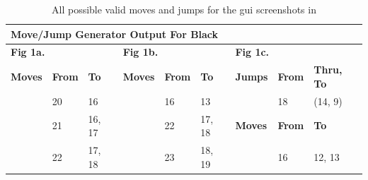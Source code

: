 \documentclass{article}
\begin{document}
\begin{table}[]
\centering
\caption{All possible valid moves and jumps for the gui screenshots in }
\label{table:moves-jumps}
\begin{tabular}{|lllllllll|}
\hline
\multicolumn{9}{|l|}{\textbf{Move/Jump Generator Output For Black}}                                                                                                                                                                                                                                                                                                  \\ \hline
\multicolumn{3}{|l|}{\textbf{Fig 1a.}}                                                                                 & \multicolumn{3}{l|}{\textbf{Fig 1b.}}                                                                                       & \multicolumn{3}{l|}{\textbf{Fig 1c.}}                                                                         \\ \hline
\multicolumn{1}{|l|}{\textbf{Moves}}           & \multicolumn{1}{l|}{\textbf{From}} & \multicolumn{1}{l|}{\textbf{To}} & \multicolumn{1}{l|}{\textbf{Moves}}           & \multicolumn{1}{l|}{\textbf{From}} & \multicolumn{1}{l|}{\textbf{To}}       & \multicolumn{1}{l|}{\textbf{Jumps}}           & \multicolumn{1}{l|}{\textbf{From}} & \textbf{Thru, To}        \\ \hline
\multicolumn{1}{|l|}{\cellcolor[HTML]{C0C0C0}} & \multicolumn{1}{l|}{20}            & \multicolumn{1}{l|}{16}          & \multicolumn{1}{l|}{\cellcolor[HTML]{C0C0C0}} & \multicolumn{1}{l|}{16}            & \multicolumn{1}{l|}{13}                & \multicolumn{1}{l|}{\cellcolor[HTML]{C0C0C0}} & \multicolumn{1}{l|}{18}            & (14, 9)                  \\ \cline{7-9}
\multicolumn{1}{|l|}{\cellcolor[HTML]{C0C0C0}} & \multicolumn{1}{l|}{21}            & \multicolumn{1}{l|}{16, 17}      & \multicolumn{1}{l|}{\cellcolor[HTML]{C0C0C0}} & \multicolumn{1}{l|}{22}            & \multicolumn{1}{l|}{17, 18}            & \multicolumn{1}{l|}{\textbf{Moves}}           & \multicolumn{1}{l|}{\textbf{From}} & \textbf{To}              \\ \cline{7-9}
\multicolumn{1}{|l|}{\cellcolor[HTML]{C0C0C0}} & \multicolumn{1}{l|}{22}            & \multicolumn{1}{l|}{17, 18}      & \multicolumn{1}{l|}{\cellcolor[HTML]{C0C0C0}} & \multicolumn{1}{l|}{23}            & \multicolumn{1}{l|}{18, 19}            & \multicolumn{1}{l|}{\cellcolor[HTML]{C0C0C0}} & \multicolumn{1}{l|}{16}            & 12, 13                   \\

\end{tabular}
\end{table}
\end{document}
